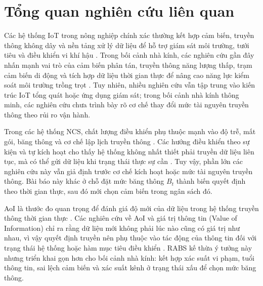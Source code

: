\documentclass[10pt]{article}
\begin{document}
\section{Tổng quan nghiên cứu liên quan}
Các hệ thống IoT trong nông nghiệp chính xác thường kết hợp cảm biến, truyền thông không dây và nền tảng xử lý dữ liệu để hỗ trợ giám sát môi trường, tưới tiêu và điều khiển vi khí hậu \cite{ayaz2019iotagriculture,sisinni2018industrialiot,shamshiri2018greenhouse,singh2024greenhouseiot}. Trong bối cảnh nhà kính, các nghiên cứu gần đây nhấn mạnh vai trò của cảm biến phân tán, truyền thông năng lượng thấp, trạm cảm biến di động và tích hợp dữ liệu thời gian thực để nâng cao năng lực kiểm soát môi trường trồng trọt \cite{davcev2018iotagriculture,jawad2020lorawanagri,bersani2022greenhouseiot,guesbaya2023greenhouse,dang2025zerotouch}. Tuy nhiên, nhiều nghiên cứu vẫn tập trung vào kiến trúc IoT tổng quát hoặc ứng dụng giám sát; trong bối cảnh nhà kính thông minh, các nghiên cứu chưa trình bày rõ cơ chế thay đổi mức tài nguyên truyền thông theo rủi ro vận hành.

Trong các hệ thống NCS, chất lượng điều khiển phụ thuộc mạnh vào độ trễ, mất gói, băng thông và cơ chế lập lịch truyền thông \cite{hespanha2007survey,park2018wirelessncs,lu2023codesign}. Các hướng điều khiển theo sự kiện và tự kích hoạt cho thấy hệ thống không nhất thiết phải truyền dữ liệu liên tục, mà có thể gửi dữ liệu khi trạng thái thực sự cần \cite{tabuada2007event,heemels2012event,lu2023codesign}. Tuy vậy, phần lớn các nghiên cứu này vẫn giả định trước cơ chế kích hoạt hoặc mức tài nguyên truyền thông. Bài báo này khác ở chỗ đặt mức băng thông $B_t$ thành biến quyết định theo thời gian thực, sau đó mới chọn cảm biến trong ngân sách đó.

AoI là thước đo quan trọng để đánh giá độ mới của dữ liệu trong hệ thống truyền thông thời gian thực \cite{kaul2012realtime,sun2017update,mena2022aoi}. Các nghiên cứu về AoI và giá trị thông tin (Value of Information) chỉ ra rằng dữ liệu mới không phải lúc nào cũng có giá trị như nhau, vì vậy quyết định truyền nên phụ thuộc vào tác động của thông tin đối với trạng thái hệ thống hoặc hàm mục tiêu điều khiển \cite{ayan2019aoi,wang2021voi,molin2019voi}. RABS kế thừa ý tưởng này nhưng triển khai gọn hơn cho bối cảnh nhà kính: kết hợp xác suất vi phạm, tuổi thông tin, sai lệch cảm biến và xác suất kênh ở trạng thái xấu để chọn mức băng thông.
\end{document}
